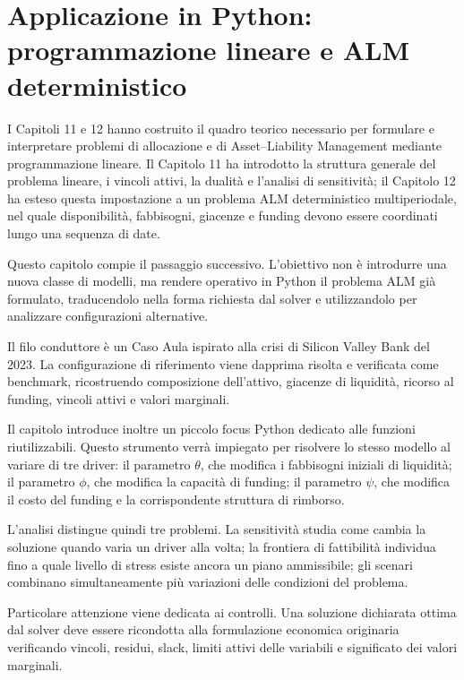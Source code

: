 

\chapter{Applicazione in Python: programmazione lineare
e ALM deterministico}

\label{cap:python-alm}

I Capitoli 11 e 12 hanno costruito il quadro teorico necessario per
formulare e interpretare problemi di allocazione e di Asset--Liability Management mediante programmazione lineare. Il Capitolo 11 ha
introdotto la struttura generale del problema lineare, i vincoli attivi, la
dualit\`a e l'analisi di sensitivit\`a; il Capitolo 12 ha esteso questa
impostazione a un problema ALM deterministico multiperiodale, nel quale
disponibilit\`a, fabbisogni, giacenze e funding devono essere coordinati lungo
una sequenza di date.

Questo capitolo compie il passaggio successivo. L'obiettivo non \`e
introdurre una nuova classe di modelli, ma rendere operativo in Python il
problema ALM gi\`a formulato, traducendolo nella forma richiesta dal solver e
utilizzandolo per analizzare configurazioni alternative.

Il filo conduttore \`e un Caso Aula ispirato alla crisi di Silicon Valley
Bank del 2023. La configurazione di riferimento viene dapprima risolta e
verificata come benchmark, ricostruendo composizione dell'attivo, giacenze di
liquidit\`a, ricorso al funding, vincoli attivi e valori marginali.

Il capitolo introduce inoltre un piccolo focus Python dedicato alle funzioni
riutilizzabili. Questo strumento verr\`a impiegato per risolvere lo stesso
modello al variare di tre driver: il parametro $\theta$, che modifica i
fabbisogni iniziali di liquidit\`a; il parametro $\phi$, che modifica la
capacit\`a di funding; il parametro $\psi$, che modifica il costo del funding
e la corrispondente struttura di rimborso.

L'analisi distingue quindi tre problemi. La sensitivit\`a studia come cambia
la soluzione quando varia un driver alla volta; la frontiera di
fattibilit\`a individua fino a quale livello di stress esiste ancora un piano
ammissibile; gli scenari combinano simultaneamente pi\`u variazioni delle
condizioni del problema.

Particolare attenzione viene dedicata ai controlli. Una soluzione dichiarata
ottima dal solver deve essere ricondotta alla formulazione economica
originaria verificando vincoli, residui, slack, limiti attivi delle variabili e significato
dei valori marginali.

